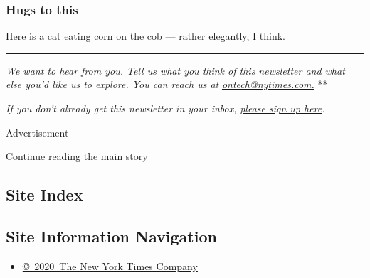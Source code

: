 \hypertarget{hugs-to-this}{%
\subsubsection{Hugs to this}\label{hugs-to-this}}

Here is a
\href{https://twitter.com/kwatt/status/1285728300128665601}{cat eating
corn on the cob} --- rather elegantly, I think.

\begin{center}\rule{0.5\linewidth}{\linethickness}\end{center}

\emph{We want to hear from you. Tell us what you think of this
newsletter and what else you'd like us to explore. You can reach us at}
\href{mailto:ontech@nytimes.com?subject=On\%20Tech\%20Feedback}{\emph{ontech@nytimes.com.}}
**

\emph{If you don't already get this newsletter in your inbox,}
\href{https://www.nytimes.com/newsletters/signup/OT}{\emph{please sign
up here}}\emph{.}

Advertisement

\protect\hyperlink{after-bottom}{Continue reading the main story}

\hypertarget{site-index}{%
\subsection{Site Index}\label{site-index}}

\hypertarget{site-information-navigation}{%
\subsection{Site Information
Navigation}\label{site-information-navigation}}

\begin{itemize}
\tightlist
\item
  \href{https://help.nytimes.com/hc/en-us/articles/115014792127-Copyright-notice}{©~2020~The
  New York Times Company}
\end{itemize}

